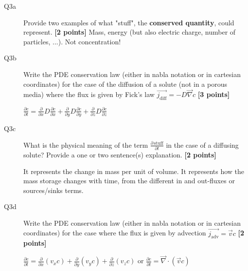 \documentclass{article}
\newcommand{\ans}[1]{\textcolor{dark-green}{#1}}
\begin{document}
\begin{description}
\item [Q3a] Provide two examples of what "stuff", the \textbf{conserved quantity}, could represent. \textbf{[2 points]}
\ans{Mass, energy (but also electric charge, number of particles, ...). Not concentration! }

\item [Q3b] Write the PDE conservation law (either in nabla notation or in cartesian coordinates) for the case of the diffusion of a solute (not in a porous media) where the flux is given by Fick's law $ \overrightarrow{j_{\mathrm{diff}}} = - D \overrightarrow{\nabla} c$ \textbf{[3 points]}

\ans{$\frac{\partial c}{\partial t} = \frac{\partial}{\partial x} D \frac{\partial c}{\partial x} + \frac{\partial}{\partial y} D \frac{\partial c}{\partial y} + \frac{\partial}{\partial z} D \frac{\partial c}{\partial z}$}


\item [Q3c] What is the physical meaning of the term $\frac{\partial \, \mathrm{stuff}}{\partial t}$ in the case of a diffusing solute? Provide a one or two sentence(s) explanation. \textbf{[2 points]}

\ans{It represents the change in mass per unit of volume. It represents how the mass storage changes with time, from the different in and out-fluxes or sources/sinks terms.}

\item [Q3d] Write the PDE conservation law (either in nabla notation or in cartesian coordinates) for the case where the flux is given by advection $ \overrightarrow{j_{\mathrm{adv}}} = \overrightarrow{v} c$ \textbf{[2 points]}

\ans{$\frac{\partial c}{\partial t} = \frac{\partial}{\partial x} (v_x c) + \frac{\partial}{\partial y} (v_y c) + \frac{\partial}{\partial z} (v_z c) $  or $\frac{\partial c}{\partial t} = \overrightarrow{\nabla} \cdot (\overrightarrow{v} c)$ }

\end{description}
\end{document}
